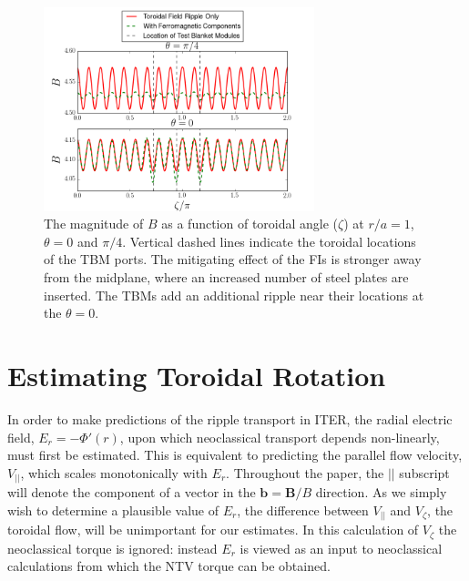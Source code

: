 \documentclass{article}
\numberwithin{figure}{section}
\numberwithin{equation}{section}
\begin{document}
\begin{figure}[h!]
\centering
\includegraphics[width=0.7\textwidth]{toroidalripple.png}
\caption{\label{fig:toroidalripple} The magnitude of $B$ as a function of toroidal angle ($\zeta$) at $r/a = 1$, $\theta = 0$ and $\pi/4$. Vertical dashed lines indicate the toroidal locations of the TBM ports. The mitigating effect of the FIs is stronger away from the midplane, where an increased number of steel plates are inserted. The TBMs add an additional ripple near their locations at the $\theta = 0$. }
\end{figure}

\FloatBarrier

\section{Estimating Toroidal Rotation}\label{rotation}

In order to make predictions of the ripple transport in ITER, the radial electric field, $E_r = - \Phi'(r) $, upon which neoclassical transport depends non-linearly, must first be estimated. This is equivalent to predicting the parallel flow velocity, $V_{||}$, which scales monotonically with $E_r$. Throughout the paper, the $||$ subscript will denote the component of a vector in the $\bm{b} = \bm{B}/B$ direction. As we simply wish to determine a plausible value of $E_r$, the difference between $V_{||}$ and $V_{\zeta}$, the toroidal flow, will be unimportant for our estimates. In this calculation of $V_{\zeta}$ the neoclassical torque is ignored: instead $E_r$ is viewed as an input to neoclassical calculations from which the NTV torque can be obtained. 
\end{document}
